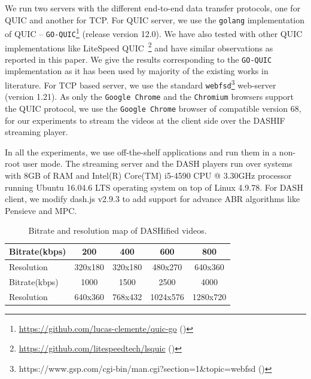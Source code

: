 We run two servers with the different end-to-end data transfer protocols, one for QUIC and another for TCP. For QUIC server, we use the {\tt golang} implementation of QUIC -- \texttt{GO-QUIC}\footnote{\url{https://github.com/lucas-clemente/quic-go} (\lastaccessedtoday)} (release version 12.0). We have also tested with other QUIC implementations like LiteSpeed QUIC~\footnote{\url{https://github.com/litespeedtech/lsquic} (\lastaccessedtoday)} and have similar observations as reported in this paper. We give the results corresponding to the \texttt{GO-QUIC} implementation as it has been used by majority of the existing works in literature. For TCP based server, we use the standard {\tt webfsd}\footnote{https://www.gsp.com/cgi-bin/man.cgi?section=1\&topic=webfsd (\lastaccessedtoday)} web-server (version 1.21). As only the {\tt Google Chrome} and the {\tt Chromium} browsers support the QUIC protocol, we use the {\tt Google Chrome} browser of compatible version 68, for our experiments to stream the videos at the client side over the DASHIF streaming player.


In all the experiments, we use off-the-shelf applications and run them in a non-root user mode. The streaming server and the DASH players run over systems with 8GB of RAM and Intel(R) Core(TM) i5-4590 CPU @ 3.30GHz processor running Ubuntu 16.04.6 LTS operating system on top of Linux 4.9.78. For DASH client, we modify dash.js v2.9.3 to add support for advance ABR algorithms like Pensieve and MPC.


\begin{table}[h]
     \caption{\label{table:bitrate}Bitrate and resolution map of DASHified videos.}
	\centering
	\begin{tabular}{|l|c|c|c|c|}
		\hline
		Bitrate(kbps) & 200 & 400 & 600 & 800 \\ \hline
		Resolution & 320x180 & 320x180 & 480x270 & 640x360 \\ \hline \hline
		Bitrate(kbps) & 1000 & 1500 & 2500 & 4000 \\ \hline
		Resolution & 640x360 & 768x432 & 1024x576 & 1280x720 \\ \hline
	\end{tabular}
\end{table}

